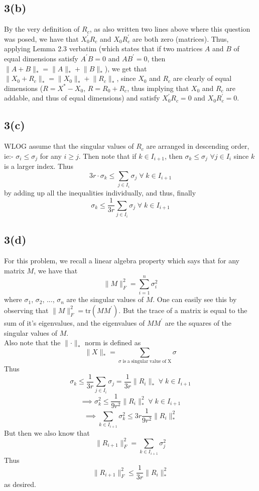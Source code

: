 \documentclass[a4paper,14pt]{article}
\numberwithin{definition}{section}
\numberwithin{mytheorem}{subsection}
\begin{document}
\subsection{3(b)}
By the very definition of $R_c$, as also written two lines above where this question was posed, we have that $X_0^{\prime}R_c$ and $X_0R_c^{\prime}$ are both zero (matrices). Thus, applying Lemma 2.3 verbatim (which states that if two matrices $A$ and $B$ of equal dimensions satisfy $A^{\prime}B = 0$ and $AB^{\prime} = 0$, then $\lVert A+B\rVert_* = \lVert A\rVert_* + \lVert B\rVert_*$), we get that $\lVert X_0+R_c\rVert_* = \lVert X_0\rVert_* + \lVert R_c\rVert_*$, since $X_0$ and $R_c$ are clearly of equal dimensions ($R = X^* - X_0$, $R = R_0 + R_c$, thus implying that $X_0$ and $R_c$ are addable, and thus of equal dimensions) and satisfy $X_0^{\prime}R_c = 0$ and $X_0R_c^{\prime} = 0$.
\subsection{3(c)}
WLOG assume that the singular values of $R_c$ are arranged in descending order, ie:- $\sigma_i \leq \sigma_j$ for any $i\geq j$. Then note that if $k\in I_{i+1}$, then $\sigma_k\leq\sigma_j$ $\forall j\in I_i$ since $k$ is a larger index. Thus
$$3r\cdot\sigma_k\leq\sum_{j\in I_i}\sigma_j\;\forall\;k\in I_{i+1}$$
by adding up all the inequalities individually, and thus, finally
$$\sigma_k\leq\frac{1}{3r}\sum_{j\in I_i}\sigma_j\;\forall\;k\in I_{i+1}$$
\subsection{3(d)}
For this problem, we recall a linear algebra property which says that for any matrix $M$, we have that
$$\lVert M\rVert_F^2 = \sum^{n}_{i = 1}\sigma^2_i$$
where $\sigma_1$, $\sigma_2$, ..., $\sigma_n$ are the singular values of $M$. One can easily see this by observing that $\lVert M\rVert_F^2 = \mathrm{tr}(MM^\prime)$. But the trace of a matrix is equal to the sum of it's eigenvalues, and the eigenvalues of $MM^\prime$ are the squares of the singular values of $M$.\\
Also note that the $\lVert\cdot\rVert_*$ norm is defined as
$$\lVert X\rVert_* = \sum_{\sigma\mathrm{\;is\;a\;singular\;value\;of\;X}} \sigma$$
Thus
$$\sigma_k\leq\frac{1}{3r}\sum_{j\in I_i}\sigma_j = \frac{1}{3r}\lVert R_i\rVert_*\;\forall\;k\in I_{i+1}$$
$$\implies \sigma^2_k\leq\frac{1}{9r^2}\lVert R_i\rVert_*^2\;\forall\;k\in I_{i+1}$$
$$\implies\sum_{k\in I_{i+1}}\sigma^2_k \leq 3r\frac{1}{9r^2}\lVert R_i\rVert_*^2$$
But then we also know that
$$\lVert R_{i+1}\rVert^2_F = \sum_{k\in I_{i+1}}\sigma_j^2$$
Thus
$$\lVert R_{i+1}\rVert^2_F \leq \frac{1}{3r}\lVert R_i\rVert_*^2$$
as desired.
\end{document}
